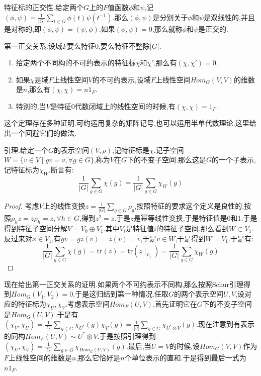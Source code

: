 特征标的正交性.给定两个$G$上的$F$值函数$\phi$和$\psi$,记$(\phi,\psi)=\frac{1}{|G|}\sum_{t\in G}\phi(t)\psi(t^{-1})$.那么$(\phi,\psi)$是分别关于$\phi$和$\psi$是双线性的,并且是对称的,即$(\phi,\psi)=(\psi,\phi)$.如果$(\phi,\psi)=0$,那么就称$\phi$和$\psi$是正交的.

第一正交关系.设域$F$要么特征0,要么特征不整除$|G|$.
\begin{enumerate}
  \item 给定两个不同构的不可约表示的特征标$\chi$和$\chi'$,那么有$(\chi,\chi')=0$.
  \item 如果$\chi$是域$F$上线性空间$V$的不可约表示,设域$F$上线性空间$Hom_G(V,V)$的维数是$n$,那么有$(\chi,\chi)=n1_F$.
  \item 特别的,当$V$是特征0代数闭域上的线性空间的时候,有$(\chi,\chi)=1_F$.
\end{enumerate}

这个定理存在多种证明.可约运用复杂的矩阵记号,也可以运用半单代数理论.这里给出一个回避它们的做法.

引理.给定一个$G$的表示空间$(V,\rho)$,记特征标是$\chi$,记子空间$W=\{v\in V\mid gv=v,\forall g\in G\}$,称为$V$在$G$下的不变子空间.那么这是$G$的一个子表示,记特征标为$\chi_W$.断言有:$$\frac{1}{|G|}\sum_{g\in G}\chi(g)=\frac{1}{|G|}\sum_{g\in G}\chi_W(g)$$
\begin{proof}

考虑$V$上的线性变换$z=\frac{1}{|G|}\sum_{g\in G}\rho_g$,按照特征的要求这个定义是良性的.按照$\rho_hz=z\rho_h=z,\forall h\in G$,得到$z^2=z$.于是$z$是幂等线性变换,于是特征值是0和1.于是得到特征子空间分解$V=V_0\oplus V_1$.其中$V_i$是特征值$i$的特征子空间.那么看到$W\subset V_1$.反过来对$x\in V_1$,有$gv=gz(v)=z(v)=v$,于是$v\in W$,于是得到$W=V_1$.于是有:$$\frac{1}{|G|}\sum_{g\in G}\chi(g)=\mathrm{tr}(z)=\mathrm{tr}(z\mid_{V_1})=\frac{1}{|G|}\sum_{g\in G}\chi_W(g)$$

\end{proof}

现在给出第一正交关系的证明.如果两个不可约表示不同构,那么按照Schur引理得到$Hom_G(V_1,V_2)=0$.于是这归结到第一种情况.任取$G$的两个表示空间$U,V$,设对应的特征标为$\chi_U,\chi_V$.考虑表示空间$Hom_F(U,V)$,首先证明它在$G$下的不变子空间是$Hom_G(U,V)$.于是有$(\chi_V,\chi_U)=\frac{1} {|G|}\sum_{g\in G}\chi_{U^*}(g)\chi_V(g)=\frac{1}{|g|}\sum_{g\in G}\chi_{U^*\otimes V}(g)$.现在注意到有表示的同构$Hom_F(U,V)\sim U^*\otimes V$.于是按照引理得到$(\chi_U,\chi_V)=\frac{1} {|G|}\sum_{g\in G}\chi_{Hom_G(U,V)}(g)$.最后,当$U=V$的时候,设$Hom_G(V,V)$作为$F$上线性空间的维数是$n$,那么它恰好是$n$个单位表示的直和.于是得到最后一式为$n1_F$.

